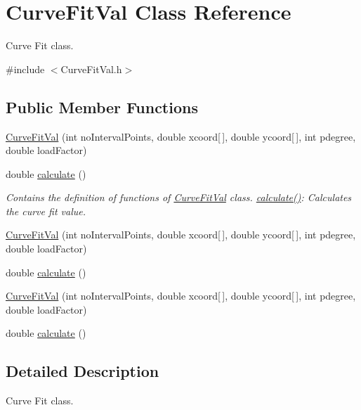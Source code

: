\hypertarget{class_curve_fit_val}{}\section{Curve\+Fit\+Val Class Reference}
\label{class_curve_fit_val}


Curve Fit class.  




{\ttfamily \#include $<$Curve\+Fit\+Val.\+h$>$}

\subsection*{Public Member Functions}
\begin{DoxyCompactItemize}
\item 
\hyperlink{class_curve_fit_val_a3f15488dbd91b1e4b8c950071402811c}{Curve\+Fit\+Val} (int no\+Interval\+Points, double xcoord\mbox{[}$\,$\mbox{]}, double ycoord\mbox{[}$\,$\mbox{]}, int pdegree, double load\+Factor)
\item 
double \hyperlink{class_curve_fit_val_ab4692d5c52b77dc03caf7b45f6377ba8}{calculate} ()
\begin{DoxyCompactList}\small\item\em Contains the definition of functions of \hyperlink{class_curve_fit_val}{Curve\+Fit\+Val} class. \hyperlink{class_curve_fit_val_ab4692d5c52b77dc03caf7b45f6377ba8}{calculate()}\+: Calculates the curve fit value. \end{DoxyCompactList}\item 
\hyperlink{class_curve_fit_val_a3f15488dbd91b1e4b8c950071402811c}{Curve\+Fit\+Val} (int no\+Interval\+Points, double xcoord\mbox{[}$\,$\mbox{]}, double ycoord\mbox{[}$\,$\mbox{]}, int pdegree, double load\+Factor)
\item 
double \hyperlink{class_curve_fit_val_ab4692d5c52b77dc03caf7b45f6377ba8}{calculate} ()
\item 
\hyperlink{class_curve_fit_val_a3f15488dbd91b1e4b8c950071402811c}{Curve\+Fit\+Val} (int no\+Interval\+Points, double xcoord\mbox{[}$\,$\mbox{]}, double ycoord\mbox{[}$\,$\mbox{]}, int pdegree, double load\+Factor)
\item 
double \hyperlink{class_curve_fit_val_ab4692d5c52b77dc03caf7b45f6377ba8}{calculate} ()
\end{DoxyCompactItemize}


\subsection{Detailed Description}
Curve Fit class. 

